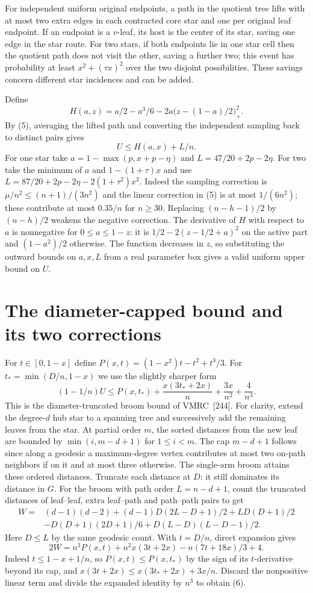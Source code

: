 For independent uniform original endpoints, a path in the quotient tree lifts with at most two extra edges in each contracted core star and one per original leaf endpoint. If an endpoint is a $v$-leaf, its host is the center of its star, saving one edge in the star route. For two stars, if both endpoints lie in one star cell then the quotient path does not visit the other, saving a further two; this event has probability at least $x^2+(\tau x)^2$ over the two disjoint possibilities. These savings concern different star incidences and can be added.

Define
\[
 H(a,z)=a/2-a^3/6-2a\bigl(z-(1-a)/2\bigr)_+^2 .
\]
By (5), averaging the lifted path and converting the independent sampling back to distinct pairs gives
\[
 U\le H(a,x)+L/n.
\]
For one star take $a=1-\max(p,x+p-\eta)$ and $L=47/20+2p-2\eta$. For two take the minimum of $a$ and $1-(1+\tau)x$ and use $L=87/20+2p-2\eta-2(1+\tau^2)x^2$. Indeed the sampling correction is $\mu/n^2\le(n+1)/(3n^2)$ and the linear correction in (5) is at most $1/(6n^2)$; these contribute at most $0.35/n$ for $n\ge30$. Replacing $(n-h-1)/2$ by $(n-h)/2$ weakens the negative correction. The derivative of $H$ with respect to $a$ is nonnegative for $0\le a\le1-z$: it is $1/2-2(z-1/2+a)^2$ on the active part and $(1-a^2)/2$ otherwise. The function decreases in $z$, so substituting the outward bounds on $a,x,L$ from a real parameter box gives a valid uniform upper bound on $U$.

\section{The diameter-capped bound and its two corrections}
For $t\in[0,1-x]$ define $P(x,t)=(1-x^2)t-t^2+t^3/3$. For $t_*=\min(D/n,1-x)$ we use the slightly sharper form
\[
 (1-1/n) U\le P(x,t_*)+\frac{x(3t_*+2x)}n+\frac{3x}{n^2}+\frac4{n^3}. \tag{6}
\]
This is the diameter-truncated broom bound of VMRC~[244]. For clarity, extend the degree-$d$ hub star to a spanning tree and successively add the remaining leaves from the star. At partial order $m$, the sorted distances from the new leaf are bounded by $\min(i,m-d+1)$ for $1\le i<m$. The cap $m-d+1$ follows since along a geodesic a maximum-degree vertex contributes at most two on-path neighbors if on it and at most three otherwise. The single-arm broom attains these ordered distances. Truncate each distance at $D$: it still dominates its distance in $G$. For the broom with path order $L=n-d+1$, count the truncated distances of leaf--leaf, extra leaf--path and path--path pairs to get
\[
 \begin{aligned} W={}&(d-1)(d-2)+(d-1)D(2L-D+1)/2+LD(D+1)/2\\
   &-D(D+1)(2D+1)/6+D(L-D)(L-D-1)/2 .\end{aligned}
\]
Here $D\le L$ by the same geodesic count. With $t=D/n$, direct expansion gives
\[
 2W=n^3P(x,t)+n^2x(3t+2x)-n(7t+18x)/3+4 .
\]
Indeed $t\le1-x+1/n$, so $P(x,t)\le P(x,t_*)$ by the sign of its $t$-derivative beyond its cap, and $x(3t+2x)\le x(3t_*+2x)+3x/n$. Discard the nonpositive linear term and divide the expanded identity by $n^3$ to obtain (6).

